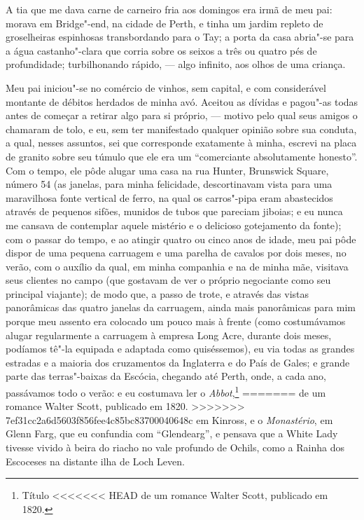 {{{{%
A tia que me dava carne de carneiro fria aos domingos era irmã de meu
pai: morava em Bridge"-end, na cidade de Perth, e tinha um jardim repleto
de groselheiras espinhosas transbordando para o Tay; a porta da casa
abria"-se para a água castanho"-clara que corria sobre os seixos a três ou
quatro pés de profundidade; turbilhonando rápido, --- algo infinito, aos
olhos de uma criança.

Meu pai iniciou"-se no comércio de vinhos, sem capital, e com
considerável montante de débitos herdados de minha avó. Aceitou as
dívidas e pagou"-as todas antes de começar a retirar algo para si
próprio, --- motivo pelo qual seus amigos o chamaram de tolo, e eu, sem
ter manifestado qualquer opinião sobre sua conduta, a qual, nesses
assuntos, sei que corresponde exatamente à minha, escrevi na placa de
granito sobre seu túmulo que ele era um ``comerciante absolutamente
honesto''. Com o tempo, ele pôde alugar uma casa na rua Hunter,
Brunswick Square, número 54 (as janelas, para minha felicidade,
descortinavam vista para uma maravilhosa fonte vertical de ferro, na
qual os carros"-pipa eram abastecidos através de pequenos sifões, munidos
de tubos que pareciam jiboias; e eu nunca me cansava de contemplar
aquele mistério e o delicioso gotejamento da fonte); com o passar do
tempo, e ao atingir quatro ou cinco anos de idade, meu pai pôde dispor
de uma pequena carruagem e uma parelha de cavalos por dois meses, no
verão, com o auxílio da qual, em minha companhia e na de minha mãe,
visitava seus clientes no campo (que gostavam de ver o próprio
negociante como seu principal viajante); de modo que, a passo de trote,
e através das vistas panorâmicas das quatro janelas da carruagem, ainda
mais panorâmicas para mim porque meu assento era colocado um pouco mais
à frente (como costumávamos alugar regularmente a carruagem à empresa
Long Acre, durante dois meses, podíamos tê"-la equipada e adaptada como
quiséssemos), eu via todas as grandes estradas e a maioria dos
cruzamentos da Inglaterra e do País de Gales; e grande parte das
terras"-baixas da Escócia, chegando até Perth, onde, a cada ano,
passávamos todo o verão: e eu costumava ler o \textit{Abbot},\footnote{Título
<<<<<<< HEAD
  de um romance Walter Scott, publicado em 1820.}
=======
  de um romance Walter Scott, publicado em 1820. 
>>>>>>> 7ef31cc2a6d5603f856fee4c85bc83700040648c
em Kinross, e o \textit{Monastério}, em Glenn Farg, que eu confundia com
``Glendearg'', e pensava que a White Lady tivesse vivido à beira do
riacho no vale profundo de Ochils, como a Rainha dos Escoceses na
distante ilha de Loch Leven.

}}}}
